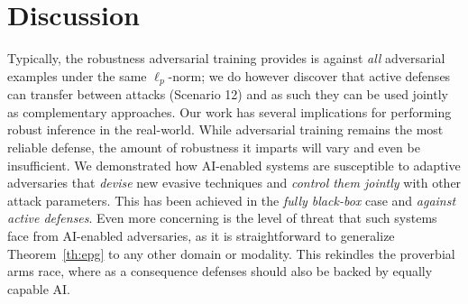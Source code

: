 
\section{Discussion}
\label{sec:discussion}

Typically, the robustness adversarial training provides is against \emph{all} adversarial examples under the same $\ell_p$-norm; we do however discover that active defenses can transfer between attacks (Scenario 12) and as such they can be used jointly as complementary approaches.
Our work has several implications for performing robust inference in the real-world.
While adversarial training remains the most reliable defense, the amount of robustness it imparts will vary and even be insufficient.
We demonstrated how AI-enabled systems are susceptible to adaptive adversaries that \emph{devise} new evasive techniques and \emph{control them jointly} with other attack parameters.
This has been achieved in the \emph{fully black-box} case and \emph{against active defenses}.
Even more concerning is the level of threat that such systems face from AI-enabled adversaries, as it is straightforward to generalize Theorem~\ref{th:epg} to any other domain or modality.
This rekindles the proverbial arms race, where as a consequence defenses should also be backed by equally capable AI.


